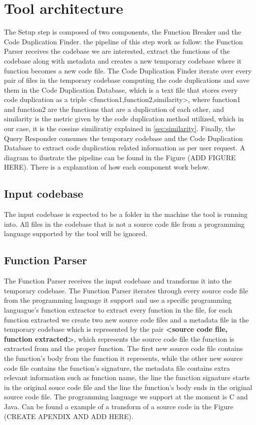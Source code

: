 \en

\section{Tool architecture}
\label{subsec:architecture}

The Setup step is composed of two components, the Function Breaker and the Code Duplication Finder. the pipeline of this step work as
follow: the Function Parser receives the codebase we are interested, extract the functions of the codebase along with metadata and
creates a new temporary codebase where it function becomes a new code file. The Code Duplication Finder iterate over every pair of 
files in the temporary codebase computing the code duplications and save them in the Code Duplication Database, which is a text file
that stores every code duplication as a triple <function1,function2,similarity>, where function1 and function2 are the functions that 
are a duplication of each other, and similarity is the metric given by the code duplication method utilized, which in our case, it is
the cossine similiratiy explained in \ref{sec:similarity}. Finally, the Query Responder consumes the temporary codebase and the 
Code Duplication Database to extract code duplication related information as per user request. A diagram to ilustrate the pipeline
can be found in the Figure (ADD FIGURE HERE). There is a explanation of how each component work below.

\subsection{Input codebase}

The input codebase is expected to be a folder in the machine the tool is running into. All files in the codebase that is not a source
code file from a programming language supported by the tool will be ignored.

\subsection{Function Parser}

The Function Parser receives the input codebase and transforms it into the temporary codebase. The Function Parser iterates through
every source code file from the programming language it support and use a specific programming languague's function 
extractor to extract
every function in the file, for each function extracted we create two new source code files and a metadata file in the temporary codebase
which is represented by the pair \textbf{<source code file, function extracted>}, which represents the source code file the 
function is extracted from and the 
proper function. The first new source code file contains the function's body from the function it represents, while the other
new source code file contains the function's signature, the metadata file 
contains extra relevant information such as function name, the line the function signature starts in the original souce code 
file and the line the function's body ends in the original source code file. The programming language we support at the moment 
is C and Java. Can be found a example of a transform of a source code in the Figure (CREATE APENDIX AND ADD HERE).

